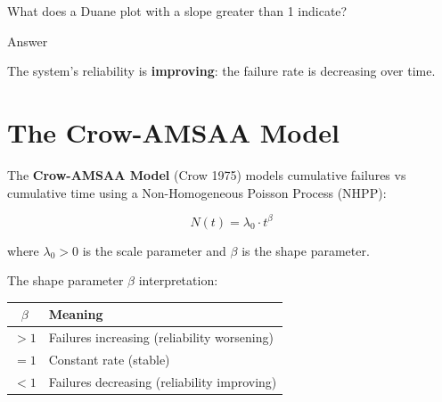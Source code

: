 \documentclass[
  letterpaper,
  DIV=11,
  numbers=noendperiod]{scrreprt}
\newcounter{none} %
\begin{document}
\begin{tcolorbox}[enhanced jigsaw, arc=.35mm, bottomrule=.15mm, bottomtitle=1mm, breakable, colback=white, colbacktitle=quarto-callout-tip-color!10!white, colframe=quarto-callout-tip-color-frame, coltitle=black, left=2mm, leftrule=.75mm, opacityback=0, opacitybacktitle=0.6, rightrule=.15mm, title=\textcolor{quarto-callout-tip-color}{\faLightbulb}\hspace{0.5em}{Review}, titlerule=0mm, toprule=.15mm, toptitle=1mm]

What does a Duane plot with a slope greater than 1 indicate?

Answer

The system's reliability is \textbf{improving}: the failure rate is
decreasing over time.

\end{tcolorbox}

\section{The Crow-AMSAA Model}\label{the-crow-amsaa-model}

The \textbf{Crow-AMSAA Model} (Crow 1975) models cumulative failures vs
cumulative time using a Non-Homogeneous Poisson Process (NHPP):

\[N(t) = \lambda_0 \cdot t^{\beta}\]

where \(\lambda_0 > 0\) is the scale parameter and \(\beta\) is the
shape parameter.

The shape parameter \(\beta\) interpretation:

{\def\LTcaptype{none} %
\begin{longtable}[]{@{}cl@{}}
\toprule\noalign{}
\(\beta\) & Meaning \\
\midrule\noalign{}
\endhead
\bottomrule\noalign{}
\endlastfoot
\(> 1\) & Failures increasing (reliability worsening) \\
\(= 1\) & Constant rate (stable) \\
\(< 1\) & Failures decreasing (reliability improving) \\
\end{longtable}
}
\end{document}
